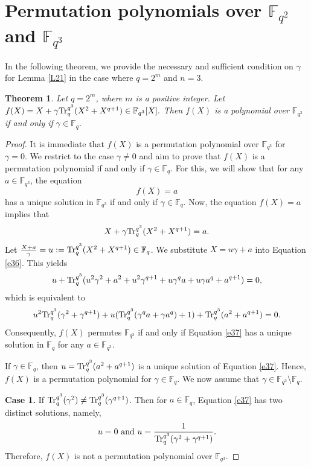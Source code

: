 \documentclass[11pt]{amsart}
\theoremstyle{plain}
\newtheorem{thm}{Theorem}[section]
\numberwithin{equation}{section}
\theoremstyle{definition}
\newcommand{\F}{\mathbb F}
\def\Tr{{\rm Tr}}
\begin{document}
\section{Permutation polynomials over $\F_{q^2}$ and $\F_{q^3}$}\label{S3}
In the following theorem, we provide the necessary and sufficient condition on $\gamma$ for Lemma \ref{L21} in the case where $q=2^m$ and $n=3.$ 

   \begin{thm}\label{T31}
    Let $q=2^m$, where $m$ is a positive integer. Let $f(X)=X+\gamma \Tr_{q}^{q^3}(X^2+X^{q+1}) \in \F_{q^3}[X].$ Then $f(X)$ is a polynomial over $\F_{q^3}$ if and only if $\gamma \in \F_q.$ 
\end{thm}
\begin{proof}
    It is immediate that $f(X)$ is a permutation polynomial over $\F_{q^3}$ for $\gamma=0.$ We restrict to the case $\gamma \neq 0$ and aim to prove that $f(X)$ is a permutation polynomial if and only if $\gamma \in \F_q.$ For this, we will show that  for any $a \in \F_{q^3}$, the equation $$f(X)=a$$  has a unique solution in $\F_{q^3}$ if and only if $\gamma \in \F_q.$ Now, the equation $f(X)=a$ implies that
    \begin{equation}\label{e36}
    X+\gamma\Tr_{q}^{q^3}(X^2+X^{q+1})=a.    
    \end{equation}
    Let $\frac{X+a}{\gamma}=u:=\Tr_{q}^{q^3}(X^2+X^{q+1}) \in \F_q$. We substitute $X=u\gamma+a$ into Equation \eqref{e36}. This yields 
    \begin{equation*}
        u+\Tr_{q}^{q^3}(u^2\gamma^2+a^2+u^2\gamma^{q+1}+u\gamma^qa+u\gamma a^q+a^{q+1})=0,
    \end{equation*}
    which is equivalent to 
    \begin{equation}\label{e37}
        u^2\Tr_{q}^{q^3}(\gamma^2+\gamma^{q+1})+u(\Tr_{q}^{q^3}(\gamma^qa+\gamma a^q)+1)+\Tr_{q}^{q^3}(a^2+a^{q+1})=0.
    \end{equation}
   Consequently, $f(X)$ permutes $\F_{q^3}$ if and only if Equation \eqref{e37} has a unique solution in $\F_q$ for any $a \in \F_{q^3}$. 

If $\gamma \in \F_q$, then $u=\Tr_{q}^{q^3}(a^2+a^{q+1})$ is a unique solution of Equation \eqref{e37}. Hence, $f(X)$ is a permutation polynomial for $\gamma \in \F_q.$ We now assume that $\gamma \in \F_{q^3} \setminus \F_q.$

\textbf{Case 1.} If $\Tr_{q}^{q^3}(\gamma^2) \neq \Tr_{q}^{q^3}(\gamma^{q+1})$. Then for $a \in \F_q$, Equation \eqref{e37} has two distinct solutions, namely, $$u=0 \text{ and }  u=\frac{1}{\Tr_{q}^{q^3}(\gamma^2+\gamma^{q+1})}.$$ Therefore, $f(X)$ is not a permutation polynomial over $\F_{q^3}$.


\end{proof}
\end{document}
